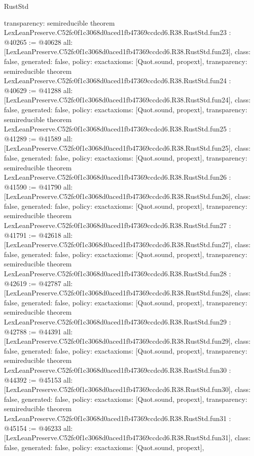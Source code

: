 \begin{lexlean}{RustStd}
\begin{coremodule}
{  transparency: semireducible
}
theorem LexLeanPreserve.C52fc0f1c3068d0aced1fb47369ccdcd6.R38.RustStd.fun23 : @40265 := @40628 {
  all: [LexLeanPreserve.C52fc0f1c3068d0aced1fb47369ccdcd6.R38.RustStd.fun23],
  class: false,
  generated: false,
  policy: exact{axioms: [Quot.sound, propext]},
  transparency: semireducible
}
theorem LexLeanPreserve.C52fc0f1c3068d0aced1fb47369ccdcd6.R38.RustStd.fun24 : @40629 := @41288 {
  all: [LexLeanPreserve.C52fc0f1c3068d0aced1fb47369ccdcd6.R38.RustStd.fun24],
  class: false,
  generated: false,
  policy: exact{axioms: [Quot.sound, propext]},
  transparency: semireducible
}
theorem LexLeanPreserve.C52fc0f1c3068d0aced1fb47369ccdcd6.R38.RustStd.fun25 : @41289 := @41589 {
  all: [LexLeanPreserve.C52fc0f1c3068d0aced1fb47369ccdcd6.R38.RustStd.fun25],
  class: false,
  generated: false,
  policy: exact{axioms: [Quot.sound, propext]},
  transparency: semireducible
}
theorem LexLeanPreserve.C52fc0f1c3068d0aced1fb47369ccdcd6.R38.RustStd.fun26 : @41590 := @41790 {
  all: [LexLeanPreserve.C52fc0f1c3068d0aced1fb47369ccdcd6.R38.RustStd.fun26],
  class: false,
  generated: false,
  policy: exact{axioms: [Quot.sound, propext]},
  transparency: semireducible
}
theorem LexLeanPreserve.C52fc0f1c3068d0aced1fb47369ccdcd6.R38.RustStd.fun27 : @41791 := @42618 {
  all: [LexLeanPreserve.C52fc0f1c3068d0aced1fb47369ccdcd6.R38.RustStd.fun27],
  class: false,
  generated: false,
  policy: exact{axioms: [Quot.sound, propext]},
  transparency: semireducible
}
theorem LexLeanPreserve.C52fc0f1c3068d0aced1fb47369ccdcd6.R38.RustStd.fun28 : @42619 := @42787 {
  all: [LexLeanPreserve.C52fc0f1c3068d0aced1fb47369ccdcd6.R38.RustStd.fun28],
  class: false,
  generated: false,
  policy: exact{axioms: [Quot.sound, propext]},
  transparency: semireducible
}
theorem LexLeanPreserve.C52fc0f1c3068d0aced1fb47369ccdcd6.R38.RustStd.fun29 : @42788 := @44391 {
  all: [LexLeanPreserve.C52fc0f1c3068d0aced1fb47369ccdcd6.R38.RustStd.fun29],
  class: false,
  generated: false,
  policy: exact{axioms: [Quot.sound, propext]},
  transparency: semireducible
}
theorem LexLeanPreserve.C52fc0f1c3068d0aced1fb47369ccdcd6.R38.RustStd.fun30 : @44392 := @45153 {
  all: [LexLeanPreserve.C52fc0f1c3068d0aced1fb47369ccdcd6.R38.RustStd.fun30],
  class: false,
  generated: false,
  policy: exact{axioms: [Quot.sound, propext]},
  transparency: semireducible
}
theorem LexLeanPreserve.C52fc0f1c3068d0aced1fb47369ccdcd6.R38.RustStd.fun31 : @45154 := @46233 {
  all: [LexLeanPreserve.C52fc0f1c3068d0aced1fb47369ccdcd6.R38.RustStd.fun31],
  class: false,
  generated: false,
  policy: exact{axioms: [Quot.sound, propext]},
}
\end{coremodule}
\end{lexlean}
